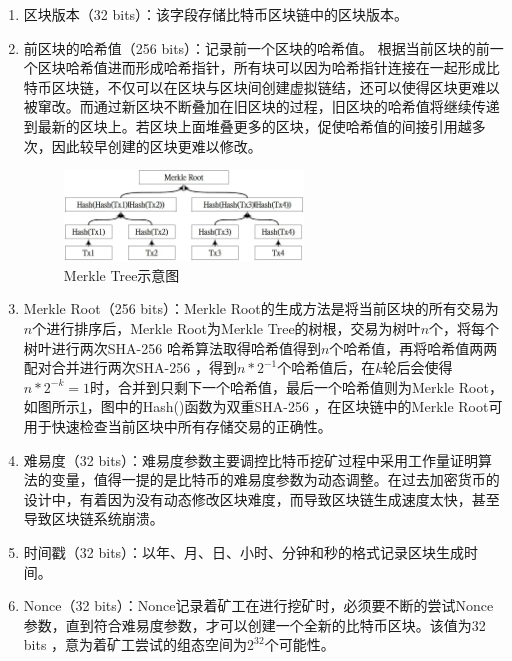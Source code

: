 				\begin{enumerate}
				\item 区块版本（32 bits）：该字段存储比特币区块链中的区块版本。
				\item 前区块的哈希值（256 bits）：记录前一个区块的哈希值。 根据当前区块的前一个区块哈希值进而形成哈希指针，所有块可以因为哈希指针连接在一起形成比特币区块链，不仅可以在区块与区块间创建虚拟链结，还可以使得区块更难以被窜改。而通过新区块不断叠加在旧区块的过程，旧区块的哈希值将继续传递到最新的区块上。若区块上面堆叠更多的区块，促使哈希值的间接引⽤越多次，因此较早创建的区块更难以修改。

				\begin{figure}[!htbp]
					\centering
					\includegraphics[width = 0.6\textwidth]{MerkleRoot.jpg}
					\caption{Merkle Tree示意图}\label{MerkleRoot}
				\end{figure}

				\item Merkle Root（256 bits）：Merkle Root的生成方法是将当前区块的所有交易为$n$个进行排序后，Merkle Root为Merkle Tree的树根，交易为树叶$n$个，将每个树叶进行两次SHA-256 哈希算法取得哈希值得到$n$个哈希值，再将哈希值两两配对合并进行两次SHA-256 ，得到$n*2^{-1}$个哈希值后，在$k$轮后会使得$n*2^{-k}=1$时，合并到只剩下一个哈希值，最后一个哈希值则为Merkle Root，如图所示\ref{MerkleRoot}，图中的Hash()函数为双重SHA-256 ，在区块链中的Merkle Root可用于快速检查当前区块中所有存储交易的正确性。

				

				\item 难易度（32 bits）：难易度参数主要调控比特币挖矿过程中采用工作量证明算法的变量，值得一提的是比特币的难易度参数为动态调整。在过去加密货币的设计中，有着因为没有动态修改区块难度，而导致区块链生成速度太快，甚至导致区块链系统崩溃。
				\item 时间戳（32 bits）：以年、月、日、小时、分钟和秒的格式记录区块生成时间。
				\item Nonce（32 bits）：Nonce记录着矿工在进行挖矿时，必须要不断的尝试Nonce参数，直到符合难易度参数，才可以创建一个全新的比特币区块。该值为32 bits ，意为着矿工尝试的组态空间为$2^{32}$个可能性。
				\end{enumerate}
				
